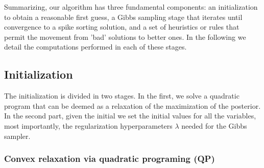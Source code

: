\documentclass[12pt,letterpaper,fleqn]{article}
\begin{document}
Summarizing, our algorithm has three fundamental components: an initialization to obtain a reasonable first guess, a Gibbs sampling stage that iterates until convergence to a spike sorting solution, and a set of heuristics or rules that permit the movement from 'bad' solutions to better ones. In the following we detail the computations performed in each of these stages.

 \subsection{Initialization}
The initialization is divided in two stages. In the first, we solve a quadratic program \cite{BoydEtal04} that can be deemed as a relaxation of the maximization of the posterior.  In the second part, given the initial we set the initial values for all the variables, most importantly, the regularization hyperparameters $\lambda$ needed for the Gibbs sampler.
 \subsubsection{Convex relaxation via quadratic programing (QP)}
 
\end{document}
